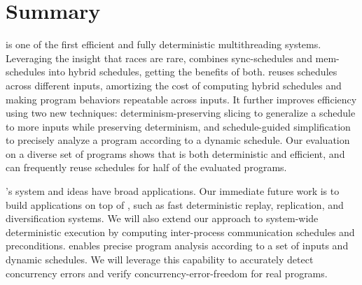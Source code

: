 \section{Summary} \label{sec:peregrine-summary}

\peregrine is one of the first efficient and fully deterministic multithreading systems.
Leveraging the insight that races are rare, \peregrine combines sync-schedules
and mem-schedules into hybrid schedules, getting the benefits of both.
\peregrine reuses schedules across different inputs, amortizing the cost of
computing hybrid schedules and making program behaviors repeatable
across inputs.  It further improves
efficiency using two new techniques: determinism-preserving slicing to
generalize a schedule to more inputs while preserving determinism, and
schedule-guided simplification to precisely analyze a program according
to a dynamic schedule.  Our evaluation on a diverse set of programs
shows that \peregrine is both deterministic and efficient, and can frequently
reuse schedules for half of the evaluated programs.



\peregrine's system and ideas have broad applications.  Our immediate future
work is to build applications on top of \peregrine, such as fast deterministic replay,
replication, and diversification systems.  We will also extend our
approach to system-wide deterministic execution by computing inter-process
communication schedules and preconditions.  \peregrine enables precise program
analysis according to a set of inputs and dynamic schedules.  We will
leverage this capability to accurately detect concurrency errors and
verify concurrency-error-freedom for real programs.

